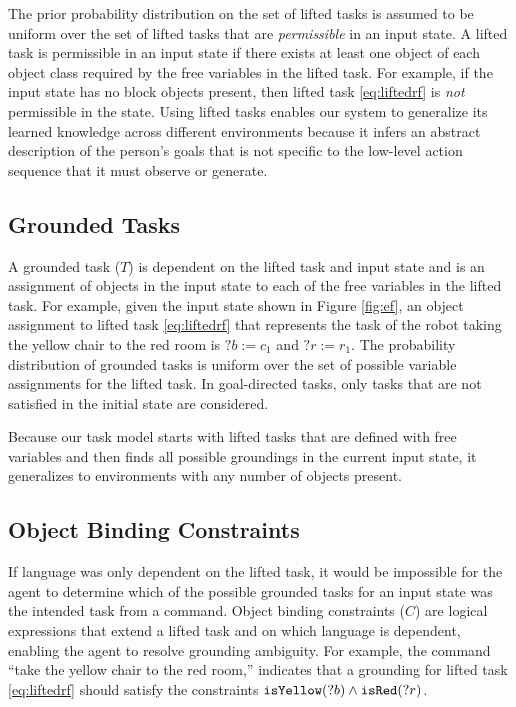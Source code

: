 \documentclass[conference]{IEEEtran}
\begin{document}
The prior probability distribution on the set of lifted tasks is assumed to be uniform over the set of lifted tasks that are {\em permissible} in an input state. A lifted task is permissible in an input state if there exists at least one object of each object class required by the free variables in the lifted task. For example, if the input state has no block objects present, then lifted task \ref{eq:liftedrf} is {\em not} permissible in the state. Using lifted tasks enables our system to generalize its learned knowledge across different environments because it infers an abstract description of the person's goals that is not specific to the low-level action sequence that it must observe or generate.

\subsection{Grounded Tasks}
A grounded task ($T$) is dependent on the lifted task and input state and is an assignment of objects in the input state to each of the free variables in the lifted task. For example, given the input state shown in Figure \ref{fig:ef}, an object assignment to lifted task \ref{eq:liftedrf} that represents the task of the robot taking the yellow chair to the red room is $?b:=c_1$ and $?r:=r_1$. The probability distribution of grounded tasks is uniform over the set of possible variable assignments for the lifted task. In goal-directed tasks, only tasks that are not satisfied in the initial state are considered.

Because our task model starts with lifted tasks that are defined with free variables and then finds all possible groundings in the current input state, it generalizes to environments with any number of objects present.

\subsection{Object Binding Constraints}
If language was only dependent on the lifted task, it would be impossible for the agent to determine which of the possible grounded tasks for an input state was the intended task from a command.
Object binding constraints ($C$) are logical expressions that extend a lifted task and on which language is dependent, enabling the agent to resolve grounding ambiguity. 
For example, the command ``take the yellow chair to the red room,'' indicates that a grounding for lifted task \ref{eq:liftedrf} should satisfy the constraints ${\tt isYellow}(?b) \land {\tt isRed}(?r)$.
\end{document}
